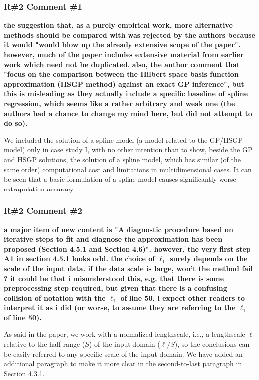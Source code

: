 \documentclass[11pt]{report}
\begin{document}
\subsubsection*{R\#2 Comment \#1}

\textbf{the suggestion that, as a purely empirical work, more alternative methods should be compared with was rejected by the authors because it would "would blow up the already extensive scope of the paper". however, much of the paper includes extensive material from earlier work which need not be duplicated. also, the author comment that "focus on the comparison between the Hilbert space basis function approximation (HSGP method) against an exact GP inference", but this is misleading as they actually include a specific baseline of spline regression, which seems like a rather arbitrary and weak one (the authors had a chance to change my mind here, but did not attempt to do so).}

We included the solution of a spline model (a model related to the GP/HSGP model) only in case study I, with no other intention than to show, beside the GP and HSGP solutions, the solution of a spline model, which has similar (of the same order) computational cost and limitations in multidimensional cases. It can be seen that a basic formulation of a spline model causes significantly worse extrapolation accuracy.


\subsubsection*{R\#2 Comment \#2}

\textbf{a major item of new content is "A diagnostic procedure based on iterative steps to fit and diagnose the approximation has been proposed (Section 4.5.1 and Section 4.6)". however, the very first step A1 in section 4.5.1 looks odd. the choice of $\ell_1$ surely depends on the scale of the input data. if the data scale is large, won't the method fail ? it could be that i misunderstood this, e.g. that there is some preprocessing step required, but given that there is a confusing collision of notation with the $\ell_1$ of line 50, i expect other readers to interpret it as i did (or worse, to assume they are referring to the $\ell_1$ of line 50).}

As said in the paper, we work with a normalized lengthscale, i.e., a lengthscale $\ell$ relative to the half-range ($S$) of the input domain ($\ell/S$), so the conclusions can be easily referred to any specific scale of the input domain. We have added an additional paragraph to make it more clear in the second-to-last paragraph in Section 4.3.1.
\end{document}
